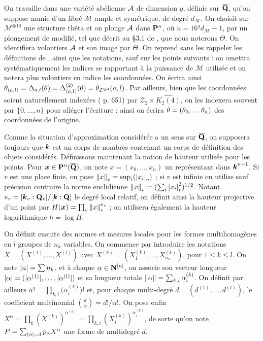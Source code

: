 On travaille dans une variété abélienne $\mathcal A$ de dimension $g$, définie sur
$\overline{\mathbf{Q}}$, qu'on suppose munie d'un fibré $\mathcal{M}$ ample et symétrique, de
degré $d_\mathcal{M}$. On choisit sur $\mathcal{M}^{\otimes 16}$ une structure
thêta et on plonge $\mathcal A$ dans $\mathbf{P}^n$, où $n=16^g d_\mathcal{M} - 1$, par un
plongement de  modifié, tel que décrit au §3.1 de \cite{daphi},
que nous noterons $\Theta$. On identifiera volontiers $\mathcal A$ et son image par
$\Theta$. On reprend sans les rappeler les définitions de ,
ainsi que les notations, sauf sur les points suivants : on omettra
systématiquement les indices se rapportant à la puissance de $\mathcal{M}$
utilisée et on notera plus volontiers en indice les coordonnées. On écrira
ainsi $\theta_{(a, l)} = \Delta_{a, l}(\theta)  = \Delta_{(a, l)}^{(2)}(\theta) =
\theta_{\mathcal{L}^{\otimes 4}}(a, l)$. Par ailleurs, bien que les coordonnées
soient naturellement indexées ( p. 651) par $\mathcal{Z}_2 \times
\widehat{K_2(4)}$, on les indexera souvent par $\{0, \dots, n\}$ pour alléger
l'écriture  ; ainsi on écrira $\theta = (\theta_0, \dots \theta_n)$ des coordonnées
de l'origine.

\pagebreak[3]

Comme la situation d'approximation considérée a un sens sur $\overline{\mathbf{Q}}$, on
supposera toujours que $\boldsymbol{k}$ est un corps de nombres contenant un corps de
définition des objets considérés. Définissons maintenant la notion de hauteur
utilisée pour les points. Pour $\boldsymbol{x} \in \mathbf{P}^n(\overline{\mathbf{Q}})$, on note $x = (x_0,
\dots, x_n)$ un représentant dans $\boldsymbol{k}^{n+1}$. Si $v$ est une place finie, on
pose $\left\lVert x\right\rVert_{v} = \sup_i(\left\lvert x_i\right\rvert_{v})$ ; si $v$ est infinie on utilise sauf précision
contraire la norme euclidienne $\left\lVert x\right\rVert_{v} = ( \sum_i \left\lvert x_i\right\rvert_{v}^2 )^{1/2}$. Notant
$e_v = [\boldsymbol{k}_v : \mathbf{Q}_v]/[\boldsymbol{k} : \mathbf{Q}]$ le degré local relatif, on définit ainsi
la hauteur projective d'un point par $H(\boldsymbol{x}) = \prod_v \left\lVert x\right\rVert_{v}^{e_v}$ ; on
utilisera également la hauteur logarithmique $h = \log H$.

On définit ensuite des normes et mesures locales pour les formes
multihomogènes en $l$ groupes de $n_k$ variables. On commence par introduire
les notations $X = (X^{(1)}, \dots, X^{(l)})$ avec $X^{(k)} = (X^{(k)}_1,
\dots, X^{(k)}_{n_k})$, pour $1 \le k \le l$. On note ${\lvert n\rvert} = \sum n_k$, et
à chaque $\alpha \in \mathbf{N}^{{\lvert n\rvert}}$, on associe son vecteur longueur
${\lvert\alpha\rvert} = ({\lvert\alpha^{(1)}\rvert}, \dots, {\lvert\alpha^{(l)}\rvert})$ et sa longueur
totale $\lVert\alpha\rVert = \sum_{k, i} \alpha^{(k)}_i$. On définit par ailleurs
$\alpha ! = \prod_{k, i} \big(\alpha^{(k)}_i\big)!$ et, pour chaque
multi-degré $d = (d^{(1)}, \dots, d^{(l)})$, le coefficient multinomial
$\binom{d}{\alpha} = d!/\alpha!$. On pose enfin $X^\alpha = \prod_k
(X^{(k)})^{\alpha^{(k)}} = \prod_{k, i} (X^{(k)}_i)^{\alpha^{(k)}_i}$, de
sorte qu'on note $P = \sum_{{\lvert\alpha\rvert} = d} p_\alpha X^\alpha$ une forme de
multidegré $d$.


